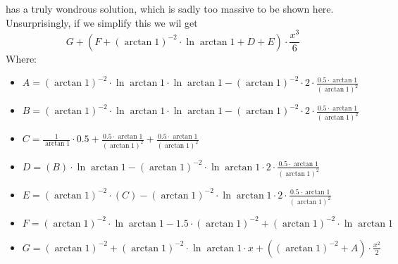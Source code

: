 \documentclass{article}
\begin{document}
has a truly wondrous solution, which is sadly too massive to be shown here.
Unsurprisingly, if we simplify this we wil get
\begin{equation}
G + \left( F + \left( \arctan 1 \right) ^{-2 } \cdot \ln \arctan 1 + D + E \right) \cdot \frac{x ^{3 } }{6 } 
\end{equation}
Where:
\begin{itemize}
	\item $A = \left( \arctan 1 \right) ^{-2 } \cdot \ln \arctan 1 \cdot \ln \arctan 1 - \left( \arctan 1 \right) ^{-2 } \cdot 2 \cdot \frac{0.5 \cdot \arctan 1 }{\left( \arctan 1 \right) ^{2 } } $
	\item $B = \left( \arctan 1 \right) ^{-2 } \cdot \ln \arctan 1 \cdot \ln \arctan 1 - \left( \arctan 1 \right) ^{-2 } \cdot 2 \cdot \frac{0.5 \cdot \arctan 1 }{\left( \arctan 1 \right) ^{2 } } $
	\item $C = \frac{1 }{\arctan 1 } \cdot 0.5 + \frac{0.5 \cdot \arctan 1 }{\left( \arctan 1 \right) ^{2 } } + \frac{0.5 \cdot \arctan 1 }{\left( \arctan 1 \right) ^{2 } } $
	\item $D = \left( B \right) \cdot \ln \arctan 1 - \left( \arctan 1 \right) ^{-2 } \cdot \ln \arctan 1 \cdot 2 \cdot \frac{0.5 \cdot \arctan 1 }{\left( \arctan 1 \right) ^{2 } } $
	\item $E = \left( \arctan 1 \right) ^{-2 } \cdot \left( C \right) - \left( \arctan 1 \right) ^{-2 } \cdot \ln \arctan 1 \cdot 2 \cdot \frac{0.5 \cdot \arctan 1 }{\left( \arctan 1 \right) ^{2 } } $
	\item $F = \left( \arctan 1 \right) ^{-2 } \cdot \ln \arctan 1 - 1.5 \cdot \left( \arctan 1 \right) ^{-2 } + \left( \arctan 1 \right) ^{-2 } \cdot \ln \arctan 1 $
	\item $G = \left( \arctan 1 \right) ^{-2 } + \left( \arctan 1 \right) ^{-2 } \cdot \ln \arctan 1 \cdot x + \left( \left( \arctan 1 \right) ^{-2 } + A \right) \cdot \frac{x ^{2 } }{2 } $
\end{itemize}
\end{document}
